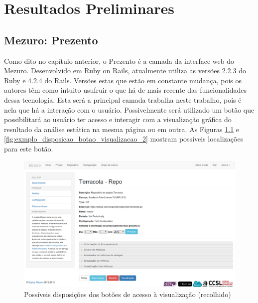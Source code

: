 \chapter{Resultados Preliminares}

\section{Mezuro: Prezento}


Como dito no capítulo anterior, o Prezento é a camada da interface web do
Mezuro. Desenvolvido em Ruby on Rails, atualmente utiliza as versões 2.2.3 do
Ruby e 4.2.4 do Rails. Versões estas que estão em constante mudança, pois os
autores têm como intuito usufruir o que há de mais recente das funcionalidades
dessa tecnologia. Esta será a principal camada trabalha neste trabalho, pois é
nela que há a interação com o usuário. Possivelmente será utilizado um botão que
possibilitará ao usuário ter acesso e interagir com a visualização gráfica do
resultado da análise estática na mesma página ou em outra. As Figuras
\ref{fig:exmplo_disposicao_botao_visualizacao_1} e
\ref{fig:exmplo_disposicao_botao_visualizacao_2} mostram possíveis localizações
para este botão.

\begin{figure}[!htb]
	\centering
    \includegraphics[keepaspectratio=true,scale=0.33]
    {figuras/exmplo_disposicao_botao_visualizacao_1.eps}
  \caption{Possíveis disposições dos botões de acesso à visualização (recolhido)}
  \label{fig:exmplo_disposicao_botao_visualizacao_1}
\end{figure}

